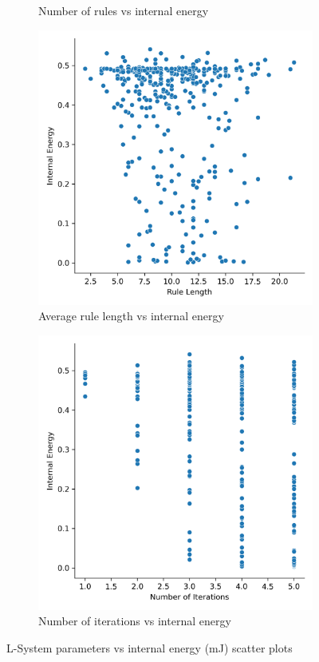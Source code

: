 \begin{figure}[H]
\begin{subfigure}[c]{0.45\textwidth}
		\caption{Number of rules vs internal energy}
	\end{subfigure}
	\hfill
	\begin{subfigure}[c]{0.45\textwidth}
		\centering
		\includegraphics[width=\textwidth]{rl_vs_ie.png}
		\caption{Average rule length vs internal energy}
	\end{subfigure}
	\hfill
	\begin{subfigure}[c]{0.45\textwidth}
		\centering
		\includegraphics[width=\textwidth]{noi_vs_ie.png}
		\caption{Number of iterations vs internal energy}
	\end{subfigure}
	\caption[L-System parameters vs internal energy]{L-System parameters vs internal energy (\si{mJ}) scatter plots}
	\label{fig:ls_v_ie}
\end{figure}

